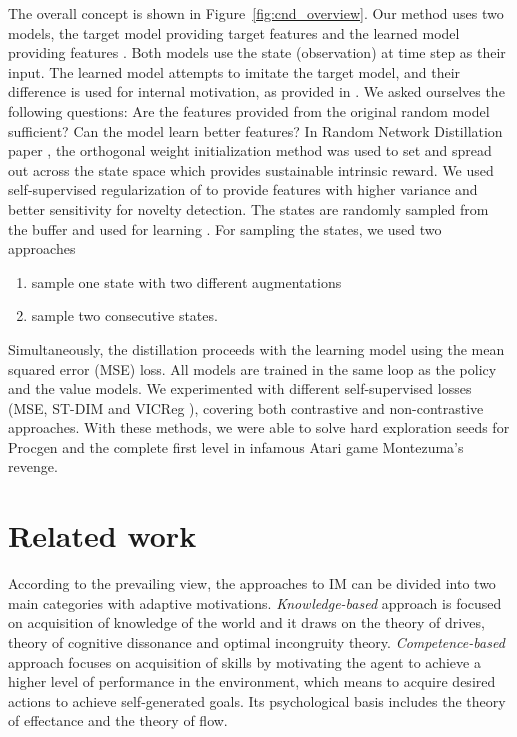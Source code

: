 \documentclass[a4paper,11pt]{elsarticle}
\begin{document}
The overall concept is shown in Figure~\ref{fig:cnd_overview}.
Our method uses two models, the target model  providing target features  and the learned model  providing features . Both models use the state (observation)  at time step  as their input. 
The learned model attempts to imitate the target model, and their difference is used for internal motivation, as provided in \cite{burda2018exploration}.
We asked ourselves the following questions: Are the features provided from the original random model  sufficient? Can the model learn better features? In Random Network Distillation paper \citep{burda2018exploration}, the orthogonal weight initialization method was used to set  and spread out  across the state space which provides sustainable intrinsic reward.
We used self-supervised regularization of  to provide features with higher variance and better sensitivity for novelty detection. 
The states are randomly sampled from the buffer and used for learning . 
For sampling the states, we used two approaches
\begin{enumerate}
    \item sample one state with two different augmentations
    \item sample two consecutive states.
\end{enumerate}
Simultaneously, the distillation proceeds with the learning model  using the mean squared error (MSE) loss.
All models are trained in the same loop as the policy and the value models.
We experimented with different self-supervised losses (MSE, ST-DIM \cite{Anand2019} and VICReg \cite{Bardes2022}), covering both contrastive and non-contrastive approaches.
With these methods, we were able to solve hard exploration seeds for Procgen and the complete  first level in infamous Atari game Montezuma's revenge.

\section{Related work}
\label{sec:related-work}

According to the prevailing view, the approaches to IM can be divided into two main categories with adaptive motivations.
\textit{Knowledge-based} approach is focused on acquisition of knowledge of the world and it draws on the theory of drives, theory of cognitive dissonance and optimal incongruity theory. \textit{Competence-based} approach focuses on acquisition of skills by motivating the agent to achieve a higher level of performance in the environment, which means to acquire desired actions to achieve self-generated goals. Its psychological basis includes the theory of effectance and the theory of flow. 
\end{document}
